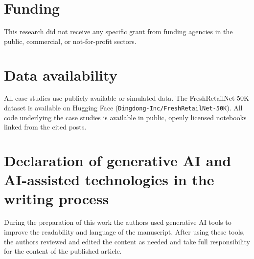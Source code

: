 \documentclass[11pt,3p,authoryear]{elsarticle}
\begin{document}
\section*{Funding}

This research did not receive any specific grant from funding agencies in the public, commercial, or not-for-profit sectors.

\section*{Data availability}

All case studies use publicly available or simulated data. The FreshRetailNet-50K dataset is available on Hugging Face (\texttt{Dingdong-Inc/FreshRetailNet-50K}). All code underlying the case studies is available in public, openly licensed notebooks linked from the cited posts.

\section*{Declaration of generative AI and AI-assisted technologies in the writing process}

During the preparation of this work the authors used generative AI tools to improve the readability and language of the manuscript. After using these tools, the authors reviewed and edited the content as needed and take full responsibility for the content of the published article.
\end{document}

